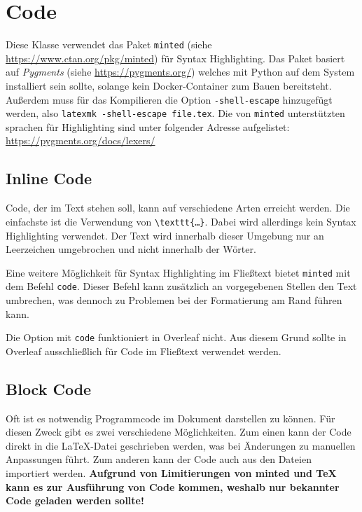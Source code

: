 \chapter{Code}
Diese Klasse verwendet das Paket \texttt{minted} (siehe \url{https://www.ctan.org/pkg/minted}) für Syntax Highlighting. Das Paket basiert auf \textit{Pygments} (siehe \url{https://pygments.org/}) welches mit Python auf dem System installiert sein sollte, solange kein Docker-Container zum Bauen bereitsteht. Außerdem muss für das Kompilieren die Option \texttt{-shell-escape} hinzugefügt werden, also \texttt{latexmk -shell-escape file.tex}. Die von \texttt{minted} unterstützten sprachen für Highlighting sind unter folgender Adresse aufgelistet: \url{https://pygments.org/docs/lexers/}

\section{Inline Code}
Code, der im Text stehen soll, kann auf verschiedene Arten erreicht werden. Die einfachste ist die Verwendung von \texttt{\textbackslash{}texttt\{…\}}. Dabei wird allerdings kein Syntax Highlighting verwendet. Der Text wird innerhalb dieser Umgebung nur an Leerzeichen umgebrochen und nicht innerhalb der Wörter.

Eine weitere Möglichkeit für Syntax Highlighting im Fließtext bietet \texttt{minted} mit dem Befehl \texttt{\texttt{code}}. Dieser Befehl kann zusätzlich an vorgegebenen Stellen den Text umbrechen, was dennoch zu Problemen bei der Formatierung am Rand führen kann.

\begin{information}
    Die Option mit \texttt{\texttt{code}} funktioniert in Overleaf nicht. Aus diesem Grund sollte in Overleaf ausschließlich \texttt{\texttt{}} für Code im Fließtext verwendet werden.
\end{information}

\section{Block Code}
Oft ist es notwendig Programmcode im Dokument darstellen zu können. Für diesen Zweck gibt es zwei verschiedene Möglichkeiten. Zum einen kann der Code direkt in die \LaTeX-Datei geschrieben werden, was bei Änderungen zu manuellen Anpassungen führt. Zum anderen kann der Code auch aus den Dateien importiert werden. \textbf{Aufgrund von Limitierungen von minted und TeX kann es zur Ausführung von Code kommen, weshalb nur bekannter Code geladen werden sollte!}

